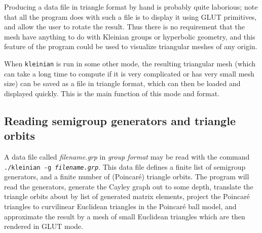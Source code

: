 \documentclass[12pt]{article}
\begin{document}
Producing a data file in triangle format by hand is probably quite laborious;
note that all the program does with such a file is to display it using GLUT
primitives, and allow the user to rotate the result. Thus there is no
requirement that the mesh have anything to do with Kleinian groups or 
hyperbolic geometry, and this feature of the program could be used to visualize
triangular meshes of any origin.

When {\tt kleinian} is run in some other mode, the resulting triangular mesh
(which can take a long time to compute if it is very complicated or has very
small mesh size) can be saved as a file in triangle format, which can then
be loaded and displayed quickly. This is the main function of this mode and
format.

\subsection{Reading semigroup generators and triangle orbits}

A data file called {\sl filename.grp} in {\em group format} may be read with
the command {\tt ./kleinian -g {\sl filename.grp}}. This data file defines
a finite list of semigroup generators, and a finite number of (Poincar\'e)
triangle orbits. The program will read the generators, generate the Cayley
graph out to some depth, translate the triangle orbits about by 
list of generated matrix elements, project the Poincar\'e triangles to
curvilinear Euclidean triangles in the Poincar\'e ball model, and approximate
the result by a mesh of small Euclidean triangles which are then rendered
in GLUT mode.
\end{document}
